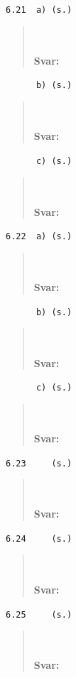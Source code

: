 \documentclass[a4paper]{article}
\newcommand{\tskcol}[1]{\textcolor{tskcol}{#1}}
\begin{document}
	\texttt{\tskcol{6.21~~a) (s.)}}
	\begin{quotation}
		\noindent
		\\ \\
		\textbf{Svar:}
	\end{quotation}
	
	\texttt{\tskcol{~~~~~~b) (s.)}}
	\begin{quotation}
		\noindent
		\\ \\
		\textbf{Svar:}
	\end{quotation}
	
	\texttt{\tskcol{~~~~~~c) (s.)}}
	\begin{quotation}
		\noindent
		\\ \\
		\textbf{Svar:}
	\end{quotation}
	
	\texttt{\tskcol{6.22~~a) (s.)}}
	\begin{quotation}
		\noindent
		\\ \\
		\textbf{Svar:}
	\end{quotation}
	
	\texttt{\tskcol{~~~~~~b) (s.)}}
	\begin{quotation}
		\noindent
		\\ \\
		\textbf{Svar:}
	\end{quotation}
	
	\texttt{\tskcol{~~~~~~c) (s.)}}
	\begin{quotation}
		\noindent
		\\ \\
		\textbf{Svar:}
	\end{quotation}
	
	\texttt{\tskcol{6.23~~~~ (s.)}}
	\begin{quotation}
		\noindent
		\\ \\
		\textbf{Svar:}
	\end{quotation}
	
	\texttt{\tskcol{6.24~~~~ (s.)}}
	\begin{quotation}
		\noindent
		\\ \\
		\textbf{Svar:}
	\end{quotation}
	
	\texttt{\tskcol{6.25~~~~ (s.)}}
	\begin{quotation}
		\noindent
		\\ \\
		\textbf{Svar:}
	\end{quotation}
	
\end{document}
